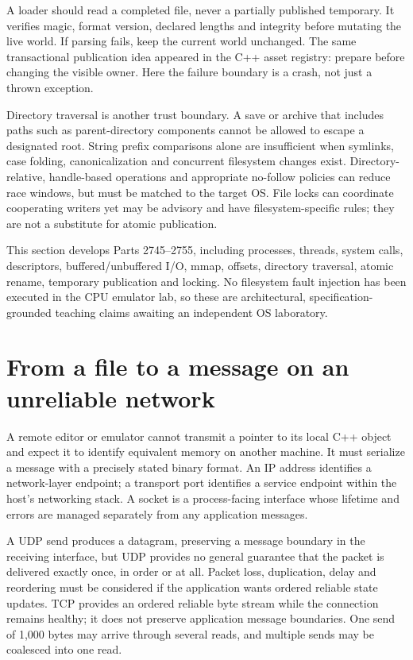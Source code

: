 A loader should read a completed file, never a partially published temporary. It verifies magic, format version, declared lengths and integrity before mutating the live world. If parsing fails, keep the current world unchanged. The same transactional publication idea appeared in the C++ asset registry: prepare before changing the visible owner. Here the failure boundary is a crash, not just a thrown exception.

Directory traversal is another trust boundary. A save or archive that includes paths such as parent-directory components cannot be allowed to escape a designated root. String prefix comparisons alone are insufficient when symlinks, case folding, canonicalization and concurrent filesystem changes exist. Directory-relative, handle-based operations and appropriate no-follow policies can reduce race windows, but must be matched to the target OS. File locks can coordinate cooperating writers yet may be advisory and have filesystem-specific rules; they are not a substitute for atomic publication.

This section develops Parts 2745--2755, including processes, threads, system calls, descriptors, buffered/unbuffered I/O, mmap, offsets, directory traversal, atomic rename, temporary publication and locking. No filesystem fault injection has been executed in the CPU emulator lab, so these are architectural, specification-grounded teaching claims awaiting an independent OS laboratory.

\section{From a file to a message on an unreliable network}\label{01-foundations-i-ch016-from-a-file-to-a-message-on-an-unreliable-network}

A remote editor or emulator cannot transmit a pointer to its local C++ object and expect it to identify equivalent memory on another machine. It must serialize a message with a precisely stated binary format. An IP address identifies a network-layer endpoint; a transport port identifies a service endpoint within the host's networking stack. A socket is a process-facing interface whose lifetime and errors are managed separately from any application messages.

A UDP send produces a datagram, preserving a message boundary in the receiving interface, but UDP provides no general guarantee that the packet is delivered exactly once, in order or at all. Packet loss, duplication, delay and reordering must be considered if the application wants ordered reliable state updates. TCP provides an ordered reliable byte stream while the connection remains healthy; it does not preserve application message boundaries. One send of 1,000 bytes may arrive through several reads, and multiple sends may be coalesced into one read.

